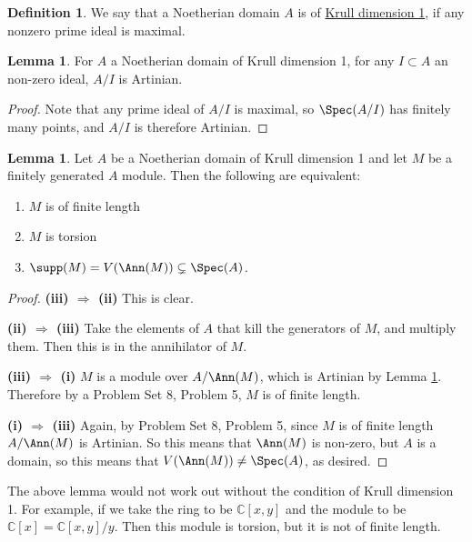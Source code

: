 \documentclass[12 pt]{article}
\theoremstyle{definition}
\newtheorem{lemma}[thm]{Lemma}
\newtheorem{defn}[thm]{Definition}
\renewcommand{\(}{\left(}
\renewcommand{\)}{\right)}
\newcommand\cc{\mathbb{C}}
\begin{document}
\begin{defn} We say that a Noetherian domain $A$ is of \underline{Krull dimension 1}, if any nonzero prime ideal is maximal.
\end{defn}

\begin{lemma} For $A$ a Noetherian domain of Krull dimension 1, for any $I \subset A$ an  non-zero ideal, $A/I$ is Artinian.
\label{quot of Krull-dim-1 is Artinian}
\end{lemma}
\begin{proof} Note that any prime ideal of $A/I$ is maximal, so $\Spec(A/I)$ has finitely many points, and $A/I$ is therefore Artinian. 
\end{proof}


\begin{lemma} Let $A$ be a Noetherian domain of Krull dimension 1 and let $M$ be a finitely generated $A$ module. Then the following are equivalent:
\begin{enumerate}
\item $M$ is of finite length
\item $M$ is torsion
\item $\supp(M)=V(\Ann(M)) \subsetneq \Spec(A)$.
\end{enumerate}
\label{Noeth, Krull 1 means fin. len iff torsion iff V(ann) neq Spec(A)}
\end{lemma}
\begin{proof}
\noindent \textbf{(iii) $\Rightarrow$ (ii)} This is clear. 

\noindent \textbf{(ii) $\Rightarrow$ (iii)} Take the elements of $A$ that kill the generators of $M$, and multiply them. Then this is in the annihilator of $M$.

\noindent \textbf{(iii) $\Rightarrow$ (i)} $M$ is a module over $A/\Ann(M)$, which is Artinian by Lemma \ref{quot of Krull-dim-1 is Artinian}. Therefore by a Problem Set 8, Problem 5, $M$ is of finite length.

\noindent \textbf{(i) $\Rightarrow$ (iii)} Again, by Problem Set 8, Problem 5, since $M$ is of finite length $A/\Ann(M)$ is Artinian. So this means that $\Ann(M)$ is non-zero, but $A$ is a domain, so this means that $V(\Ann(M)) \neq \Spec(A)$, as desired.
\end{proof}


The above lemma would not work out without the condition of Krull dimension 1. For example, if we take the ring to be $\cc[x,y]$ and the module to be $\cc[x]=\cc[x,y]/y$. Then this module is torsion, but it is not of finite length.
\end{document}
